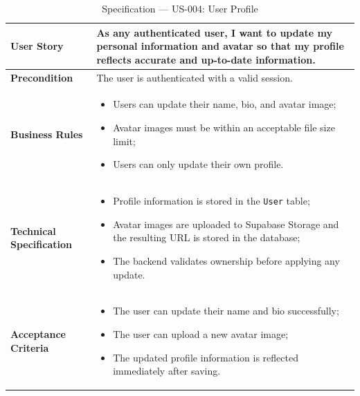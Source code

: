 \begin{table}[H]
\centering
\caption{Specification — US-004: User Profile}
\label{tab:us004}
\renewcommand{\arraystretch}{1}
\begin{tabularx}{\textwidth}{|p{2.5cm}|X|}
\hline
\textbf{User Story} & As any authenticated user, I want to update my personal information and avatar so that my profile reflects accurate and up-to-date information. \\
\hline
\textbf{Precondition} & The user is authenticated with a valid session. \\
\hline
\textbf{Business Rules} &
\begin{itemize}
  \item Users can update their name, bio, and avatar image;
  \item Avatar images must be within an acceptable file size limit;
  \item Users can only update their own profile.
\end{itemize} \\
\hline
\textbf{Technical Specification} &
\begin{itemize}
  \item Profile information is stored in the \texttt{User} table;
  \item Avatar images are uploaded to Supabase Storage and the resulting URL is stored in the database;
  \item The backend validates ownership before applying any update.
\end{itemize} \\
\hline
\textbf{Acceptance Criteria} &
\begin{itemize}
  \item The user can update their name and bio successfully;
  \item The user can upload a new avatar image;
  \item The updated profile information is reflected immediately after saving.
\end{itemize} \\
\hline
\end{tabularx}
\end{table}

